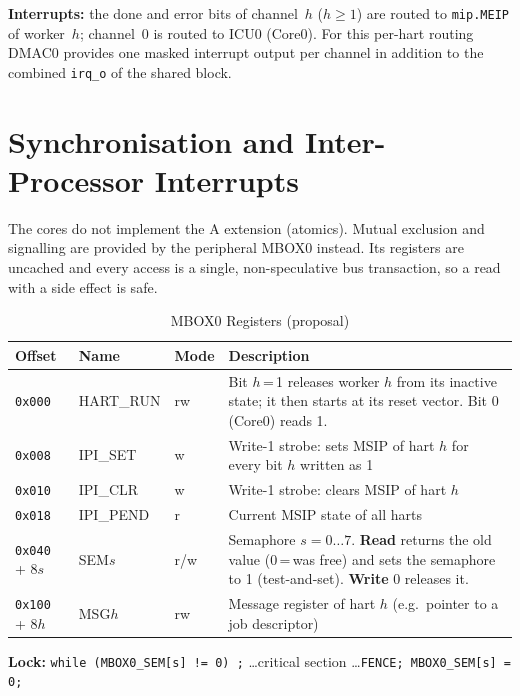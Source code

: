 \textbf{Interrupts:} the done and error bits of channel~$h$ ($h \geq 1$) are
routed to \texttt{mip.MEIP} of worker~$h$; channel~0 is routed to ICU0
(Core0). For this per-hart routing DMAC0 provides one masked interrupt
output per channel in addition to the combined \texttt{irq\_o} of the
shared block.

\section{Synchronisation and Inter-Processor Interrupts}
\label{sec:mcnnsync}

The cores do not implement the A extension (atomics). Mutual exclusion and
signalling are provided by the peripheral MBOX0 instead. Its registers are
uncached and every access is a single, non-speculative bus transaction,
so a read with a side effect is safe.

\begin{table}[H]
\caption{MBOX0 Registers (proposal)}
\label{tab:mcnnmboxregs}
\centering
{\footnotesize
\begin{tabularx}{\textwidth}{|l |l |l |X|}
  \hline
  Offset & Name & Mode & Description \\
  \hline
  \hline
  \texttt{0x000} & HART\_RUN & rw & Bit $h$\,=\,1 releases worker $h$ from its
    inactive state; it then starts at its reset vector. Bit 0 (Core0) reads 1. \\
  \hline
  \texttt{0x008} & IPI\_SET & w & Write-1 strobe: sets MSIP of hart $h$ for every bit $h$ written as 1 \\
  \hline
  \texttt{0x010} & IPI\_CLR & w & Write-1 strobe: clears MSIP of hart $h$ \\
  \hline
  \texttt{0x018} & IPI\_PEND & r & Current MSIP state of all harts \\
  \hline
  \texttt{0x040} + $8s$ & SEM$s$ & r/w & Semaphore $s = 0\ldots7$.
    \textbf{Read} returns the old value (0\,=\,was free) and sets the
    semaphore to 1 (test-and-set). \textbf{Write} 0 releases it. \\
  \hline
  \texttt{0x100} + $8h$ & MSG$h$ & rw & Message register of hart $h$
    (e.g.\ pointer to a job descriptor) \\
  \hline
\end{tabularx}}
\end{table}

\textbf{Lock:} \texttt{while (MBOX0\_SEM[s] != 0) ;} \ldots critical section
\ldots \texttt{FENCE; MBOX0\_SEM[s] = 0;}

